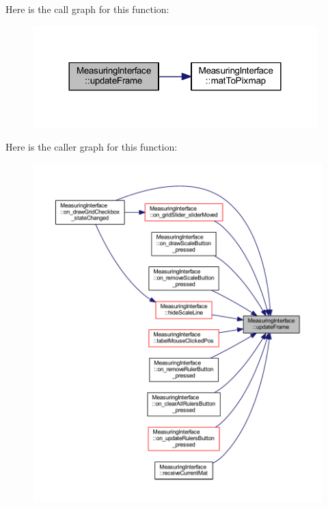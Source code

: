 Here is the call graph for this function\+:
\nopagebreak
\begin{figure}[H]
\begin{center}
\leavevmode
\includegraphics[width=312pt]{classMeasuringInterface_ac117ad50a7b325e4aff2651a6a04d1f4_cgraph}
\end{center}
\end{figure}
Here is the caller graph for this function\+:
\nopagebreak
\begin{figure}[H]
\begin{center}
\leavevmode
\includegraphics[width=350pt]{classMeasuringInterface_ac117ad50a7b325e4aff2651a6a04d1f4_icgraph}
\end{center}
\end{figure}
\mbox{\label{classMeasuringInterface_a049b5fba322e426db13761cf8d66f8a2}} 
